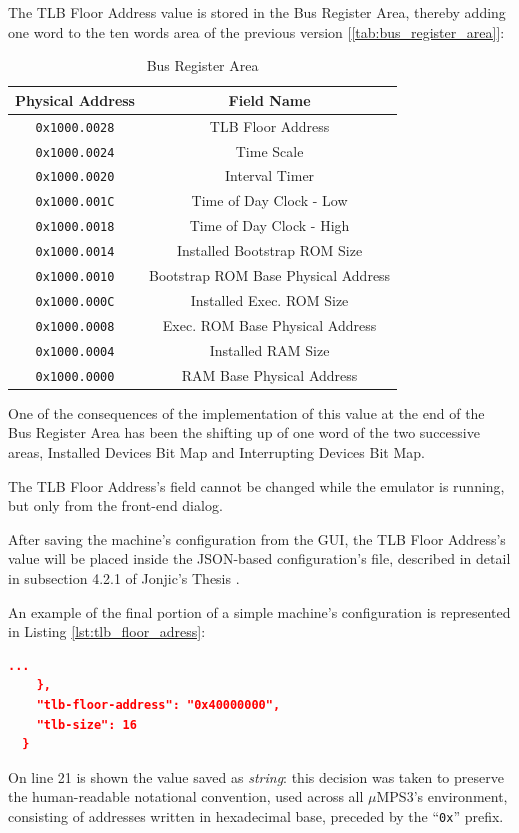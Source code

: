 \documentclass[12pt,a4paper,openright,twoside]{report}
\begin{document}
The TLB Floor Address value is stored in the Bus Register Area, thereby adding one word to the ten words area of the previous version [\autoref{tab:bus_register_area}]:
\begin{table}[h]
	\centering
	\renewcommand{\arraystretch}{0.98}
	\begin{tabular}{|c|c|}
		\hline
		Physical Address     & Field Name                          \\ \hline\hline
		\texttt{0x1000.0028} & TLB Floor Address                   \\ \hline
		\texttt{0x1000.0024} & Time Scale                          \\ \hline
		\texttt{0x1000.0020} & Interval Timer                      \\ \hline
		\texttt{0x1000.001C} & Time of Day Clock - Low             \\ \hline
		\texttt{0x1000.0018} & Time of Day Clock - High            \\ \hline
		\texttt{0x1000.0014} & Installed Bootstrap ROM Size        \\ \hline
		\texttt{0x1000.0010} & Bootstrap ROM Base Physical Address \\ \hline
		\texttt{0x1000.000C} & Installed Exec. ROM Size            \\ \hline
		\texttt{0x1000.0008} & Exec. ROM Base Physical Address     \\ \hline
		\texttt{0x1000.0004} & Installed RAM Size                  \\ \hline
		\texttt{0x1000.0000} & RAM Base Physical Address           \\ \hline
	\end{tabular}
	\caption{Bus Register Area}
	\label{tab:bus_register_area}
\end{table}

One of the consequences of the implementation of this value at the end of the Bus Register Area has been the shifting up of one word of the two successive areas, Installed Devices Bit Map and Interrupting Devices Bit Map.

The TLB Floor Address's field cannot be changed while the emulator is running, but only from the front-end dialog.

After saving the machine's configuration from the GUI, the TLB Floor Address's value will be placed inside the JSON-based configuration's file, described in detail in subsection 4.2.1 of Jonjic's Thesis \cite{tjonjic}.

An example of the final portion of a simple machine's configuration is represented in Listing \ref{lst:tlb_floor_adress}:
\begin{lstlisting}[language=json,firstnumber=19,caption={TLB Floor Address},captionpos=b,label={lst:tlb_floor_adress}]
    ...
    },
    "tlb-floor-address": "0x40000000",
    "tlb-size": 16
  }
  \end{lstlisting}
On line 21 is shown the value saved as \textit{string}: this decision was taken to preserve the human-readable notational convention, used across all $\mu$MPS3's environment, consisting of addresses written in hexadecimal base, preceded by the ``\texttt{0x}'' prefix.
\end{document}
